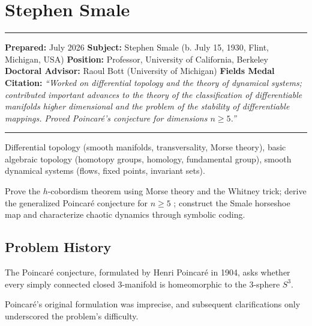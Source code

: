 \chapter{Stephen Smale}\label{ch1966stephensmale:stephen-smale-fields-medal-1966-a-comprehensive-report}

\begin{center}\rule{0.5\linewidth}{0.5pt}\end{center}

\textbf{Prepared:} July 2026
\textbf{Subject:} Stephen Smale (b. July 15, 1930, Flint, Michigan, USA)
\textbf{Position:} Professor, University of California, Berkeley
\textbf{Doctoral Advisor:} Raoul Bott (University of Michigan)
\textbf{Fields Medal Citation:} \emph{``Worked on differential topology and the theory of dynamical systems; contributed important advances to the theory of the classification of differentiable manifolds higher dimensional and the problem of the stability of differentiable mappings. Proved Poincaré's conjecture for dimensions $n \geq 5$.''}

\begin{center}\rule{0.5\linewidth}{0.5pt}\end{center}

\begin{prereqs}
Differential topology (smooth manifolds, transversality, Morse theory), basic algebraic topology (homotopy groups, homology, fundamental group), smooth dynamical systems (flows, fixed points, invariant sets).
\end{prereqs}

\begin{objectives}
Prove the $h$-cobordism theorem using Morse theory and the Whitney trick; derive the generalized Poincaré conjecture for $n \geq 5$ \cite{smale1961}; construct the Smale horseshoe map and characterize chaotic dynamics through symbolic coding.
\end{objectives}

\section{Problem History}

The Poincaré conjecture, formulated by Henri Poincaré in 1904, asks whether every simply connected closed 3-manifold is homeomorphic to the 3-sphere $S^3$.

Poincaré's original formulation was imprecise, and subsequent clarifications only underscored the problem's difficulty.

